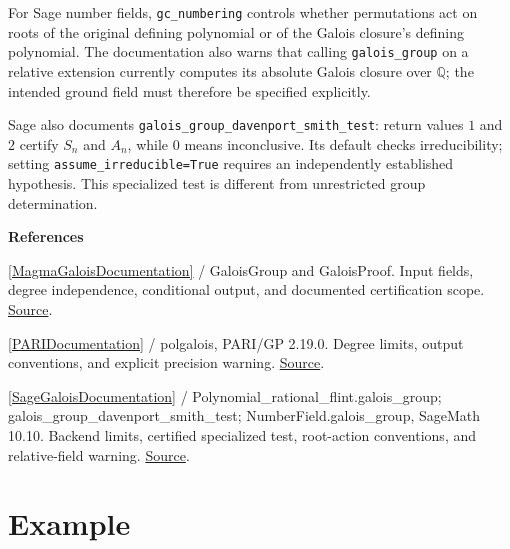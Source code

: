 \documentclass[11pt,a4paper,oneside,openany]{book}
\newenvironment{sources}{\par\smallskip\begingroup\footnotesize\color{atlasgray}\leftskip=10pt\setlength{\parskip}{2pt}}{\par\endgroup\smallskip}
\begin{document}
\color{black} For Sage number fields, \texttt{gc\_\allowbreak{}numbering} controls whether permutations act on roots of the original defining polynomial or of the Galois closure's defining polynomial. The documentation also warns that calling \texttt{galois\_\allowbreak{}group} on a relative extension currently computes its absolute Galois closure over \(\mathbb Q\); the intended ground field must therefore be specified explicitly.\par
\color{black} Sage also documents \texttt{galois\_\allowbreak{}group\_\allowbreak{}davenport\_\allowbreak{}smith\_\allowbreak{}test}: return values \(1\) and \(2\) certify \(S_n\) and \(A_n\), while \(0\) means inconclusive. Its default checks irreducibility; setting \texttt{assume\_\allowbreak{}irreducible=True} requires an independently established hypothesis. This specialized test is different from unrestricted group determination.\par
\begin{sources}
\textbf{References}\par\smallskip
\noindent\hyperlink{ref:MagmaGaloisDocumentation}{[MagmaGaloisDocumentation]} / GaloisGroup and GaloisProof. Input fields, degree independence, conditional output, and documented certification scope. \href{https://docs.magma-maths.org/GlobalFields/GaloisGroupsAndAutomorphisms/galois.html}{Source}.\par
\noindent\hyperlink{ref:PARIDocumentation}{[PARIDocumentation]} / polgalois, PARI/GP 2.19.0. Degree limits, output conventions, and explicit precision warning. \href{https://pari.math.u-bordeaux.fr/dochtml/ref/General_number_fields.html}{Source}.\par
\noindent\hyperlink{ref:SageGaloisDocumentation}{[SageGaloisDocumentation]} / Polynomial\_\allowbreak{}rational\_\allowbreak{}flint.galois\_\allowbreak{}group; galois\_\allowbreak{}group\_\allowbreak{}davenport\_\allowbreak{}smith\_\allowbreak{}test; NumberField.galois\_\allowbreak{}group, SageMath 10.10. Backend limits, certified specialized test, root-action conventions, and relative-field warning. \href{https://doc.sagemath.org/html/en/reference/polynomial_rings/sage/rings/polynomial/polynomial_rational_flint.html}{Source}.\par
\end{sources}\color{black}
\section{Example}
\end{document}

